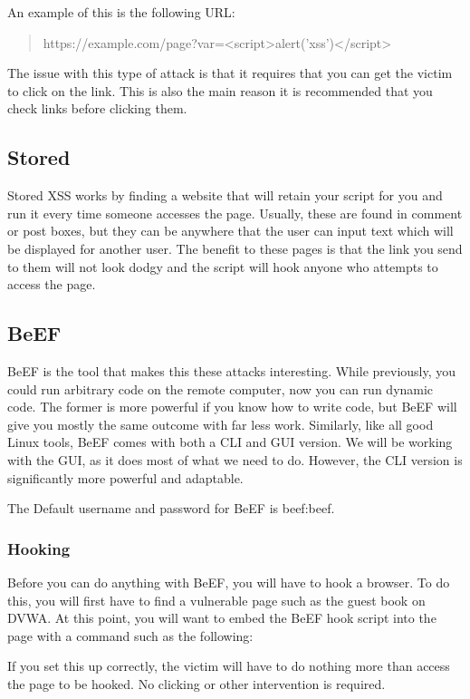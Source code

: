			An example of this is the following URL:
			\begin{quote}
				https://example.com/page?var=<script>alert('xss')</script>
			\end{quote}

			The issue with this type of attack is that it requires that you can get the victim to click on the link.
			This is also the main reason it is recommended that you check links before clicking them.
		\subsection{Stored}
			Stored XSS works by finding a website that will retain your script for you and run it every time someone accesses the page. 
			Usually, these are found in comment or post boxes, but they can be anywhere that the user can input text which will be displayed for another user. 
			The benefit to these pages is that the link you send to them will not look dodgy and the script will hook anyone who attempts to access the page. 
		\subsection{BeEF}
			BeEF is the tool that makes this these attacks interesting. 	
			While previously, you could run arbitrary code on the remote computer, now you can run dynamic code. 
			The former is more powerful if you know how to write code, but BeEF will give you mostly the same outcome with far less work. 
			Similarly, like all good Linux tools, BeEF comes with both a CLI and GUI version. 
			We will be working with the GUI, as it does most of what we need to do. 
			However, the CLI version is significantly more powerful and adaptable. 
			
			The Default username and password for BeEF is beef:beef.
			\subsubsection{Hooking}
				Before you can do anything with BeEF, you will have to hook a browser. 
				To do this, you will first have to find a vulnerable page such as the guest book on DVWA. 
				At this point, you will want to embed the BeEF hook script into the page with a command such as the following:
				
				If you set this up correctly, the victim will have to do nothing more than access the page to be hooked. 
				No clicking or other intervention is required. 
